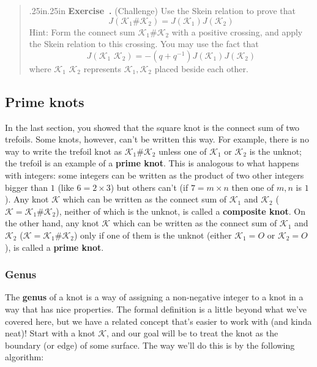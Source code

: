 \documentclass[12 pt]{article}
\newcounter{exercise}[section]
\newenvironment{exercise}{\refstepcounter{exercise}\par\bigskip \begin{quotation}{}{\leftmargin .25in\rightmargin .25in}
	\noindent \textbf{Exercise~\thesection.\theexercise }  \rmfamily}{\end{quotation}\par\bigskip}
\begin{document}
\begin{exercise}
(Challenge) Use the Skein relation to prove that
$$J(\mathcal{K}_1\#\mathcal{K}_2)=J(\mathcal{K}_1)J(\mathcal{K}_2)$$
Hint: Form the connect sum $\mathcal{K}_1\#\mathcal{K}_2$ with a positive crossing, and apply the Skein relation to this crossing. You may use the fact that
$$J(\mathcal{K}_1\,\,\mathcal{K}_2)=-(q+q^{-1})J(\mathcal{K}_1)J(\mathcal{K}_2)$$
where $\mathcal{K}_1\,\,\mathcal{K}_2$ represents $\mathcal{K}_1,\mathcal{K}_2$ placed beside each other.
\end{exercise}

\subsection{Prime knots}
In the last section, you showed that the square knot is the connect sum of two trefoils. Some knots, however, can't be written this way. For example, there is no way to write the trefoil knot as $\mathcal{K}_1\#\mathcal{K}_2$ unless one of $\mathcal{K}_1$ or $\mathcal{K}_2$ is the unknot; the trefoil is an example of a \textbf{prime knot}. This is analogous to what happens with integers: some integers can be written as the product of two other integers bigger than $1$ (like $6=2\times3$) but others can't (if $7=m\times n$ then one of $m,n$ is $1$). Any knot $\mathcal{K}$ which can be written as the connect sum of $\mathcal{K}_1$ and $\mathcal{K}_2$ ($\mathcal{K} = \mathcal{K}_1\# \mathcal{K}_2$), neither of which is the unknot, is called a \textbf{composite knot}. On the other hand, any knot $\mathcal{K}$ which can be written as the connect sum of $\mathcal{K}_1$ and $\mathcal{K}_2$ ($\mathcal{K} = \mathcal{K}_1\# \mathcal{K}_2$) only if one of them is the unknot (either $\mathcal{K}_1 = O$ or $\mathcal{K}_2 = O$), is called a \textbf{prime knot}.

\subsubsection{Genus}
The \textbf{genus} of a knot is a way of assigning a non-negative integer to a knot in a way that has nice properties. The formal definition is a little beyond what we've covered here, but we have a related concept that's easier to work with (and kinda neat)! Start with a knot $\mathcal{K}$, and our goal will be to treat the knot as the boundary (or edge) of some surface. The way we'll do this is by the following algorithm:
\end{document}

